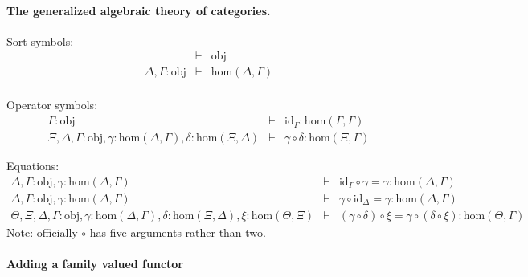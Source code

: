 \documentclass[11pt,a4paper]{article}
\theoremstyle{definition}
\newcommand{\id}{\mathsf{id}}
\def\Obj{\mathrm{obj}}
\def\Hom{\mathrm{hom}}
\def\id{\mathrm{id}}
\begin{document}
\paragraph{The generalized algebraic theory of categories.}
\begin{tiny}
Sort symbols:
\begin{eqnarray*}
&\vdash& \Obj\\
\Delta, \Gamma : \Obj &\vdash& \Hom(\Delta,\Gamma)\\
\end{eqnarray*}

Operator symbols:
\begin{eqnarray*}
\Gamma : \Obj &\vdash& \id_\Gamma : \Hom(\Gamma,\Gamma)\\
\Xi,\Delta,\Gamma : \Obj, \gamma : \Hom(\Delta,\Gamma), \delta : \Hom(\Xi,\Delta) &\vdash&
\gamma \circ \delta : \Hom(\Xi,\Gamma)
\end{eqnarray*}

Equations:
\begin{eqnarray*}
\Delta, \Gamma : \Obj, \gamma : \Hom(\Delta,\Gamma) &\vdash& \id_\Gamma \circ \gamma = \gamma : \Hom(\Delta,\Gamma)\\
\Delta, \Gamma : \Obj, \gamma : \Hom(\Delta,\Gamma) &\vdash& \gamma \circ \id_\Delta = \gamma : \Hom(\Delta,\Gamma)\\
\Theta, \Xi,\Delta,\Gamma : \Obj, \gamma : \Hom(\Delta,\Gamma), \delta : \Hom(\Xi,\Delta), \xi : \Hom(\Theta,\Xi) &\vdash&
(\gamma \circ \delta) \circ \xi = \gamma \circ (\delta \circ \xi): \Hom(\Theta,\Gamma)
\end{eqnarray*}
Note: officially $\circ$ has five arguments rather than two.
\end{tiny}

\paragraph{Adding a family valued functor}
\end{document}

